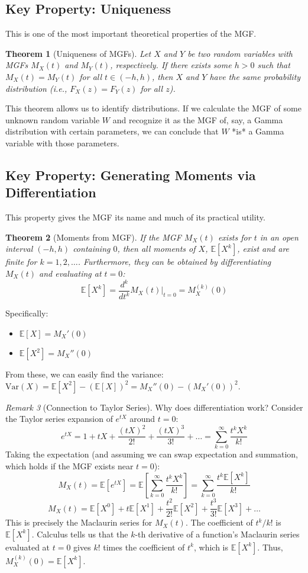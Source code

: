 \documentclass[11pt]{article}
\newtheorem{theorem}{Theorem}[section]
\theoremstyle{definition}
\theoremstyle{remark}
\newtheorem{remark}[theorem]{Remark}
\newcommand{\E}{\mathbb{E}}
\newcommand{\Var}{\text{Var}}
\begin{document}
\subsection{Key Property: Uniqueness}

This is one of the most important theoretical properties of the MGF.

\begin{theorem}[Uniqueness of MGFs]
Let $X$ and $Y$ be two random variables with MGFs $M_X(t)$ and $M_Y(t)$, respectively. If there exists some $h > 0$ such that $M_X(t) = M_Y(t)$ for all $t \in (-h, h)$, then $X$ and $Y$ have the same probability distribution (i.e., $F_X(z) = F_Y(z)$ for all $z$).
\end{theorem}

This theorem allows us to identify distributions. If we calculate the MGF of some unknown random variable $W$ and recognize it as the MGF of, say, a Gamma distribution with certain parameters, we can conclude that $W$ *is* a Gamma variable with those parameters.

\subsection{Key Property: Generating Moments via Differentiation}

This property gives the MGF its name and much of its practical utility.

\begin{theorem}[Moments from MGF]
If the MGF $M_X(t)$ exists for $t$ in an open interval $(-h, h)$ containing $0$, then all moments of $X$, $\E[X^k]$, exist and are finite for $k=1, 2, \dots$. Furthermore, they can be obtained by differentiating $M_X(t)$ and evaluating at $t=0$:
\[ \E[X^k] = \frac{d^k}{dt^k} M_X(t) \bigg|_{t=0} = M_X^{(k)}(0) \]
\end{theorem}

Specifically:
\begin{itemize}
    \item $\E[X] = M_X'(0)$
    \item $\E[X^2] = M_X''(0)$
\end{itemize}
From these, we can easily find the variance: $\Var(X) = \E[X^2] - (\E[X])^2 = M_X''(0) - (M_X'(0))^2$.

\begin{remark}[Connection to Taylor Series]
Why does differentiation work? Consider the Taylor series expansion of $e^{tX}$ around $t=0$:
\[ e^{tX} = 1 + tX + \frac{(tX)^2}{2!} + \frac{(tX)^3}{3!} + \dots = \sum_{k=0}^\infty \frac{t^k X^k}{k!} \]
Taking the expectation (and assuming we can swap expectation and summation, which holds if the MGF exists near $t=0$):
\[ M_X(t) = \E[e^{tX}] = \E\left[\sum_{k=0}^\infty \frac{t^k X^k}{k!}\right] = \sum_{k=0}^\infty \frac{t^k \E[X^k]}{k!} \]
\[ M_X(t) = \E[X^0] + t\E[X^1] + \frac{t^2}{2!}\E[X^2] + \frac{t^3}{3!}\E[X^3] + \dots \]
This is precisely the Maclaurin series for $M_X(t)$. The coefficient of $t^k/k!$ is $\E[X^k]$. Calculus tells us that the $k$-th derivative of a function's Maclaurin series evaluated at $t=0$ gives $k!$ times the coefficient of $t^k$, which is $\E[X^k]$. Thus, $M_X^{(k)}(0) = \E[X^k]$.
\end{remark}
\end{document}
